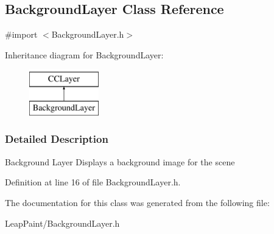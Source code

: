 \hypertarget{interface_background_layer}{\subsection{Background\-Layer Class Reference}
\label{d0/d09/interface_background_layer}
}


{\ttfamily \#import $<$Background\-Layer.\-h$>$}

Inheritance diagram for Background\-Layer\-:\begin{figure}[H]
\begin{center}
\leavevmode
\includegraphics[height=2.000000cm]{d0/d09/interface_background_layer}
\end{center}
\end{figure}


\subsubsection{Detailed Description}
Background Layer Displays a background image for the scene 

Definition at line 16 of file Background\-Layer.\-h.



The documentation for this class was generated from the following file\-:\begin{DoxyCompactItemize}
\item 
Leap\-Paint/Background\-Layer.\-h\end{DoxyCompactItemize}
